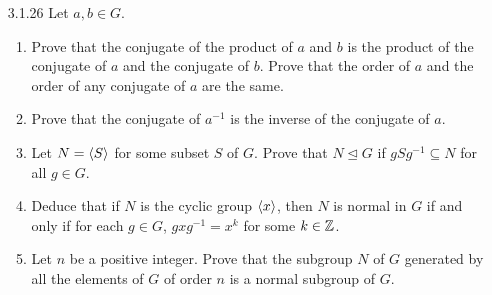 \begin{enumerate}
\begin{enumerate}
               ($\Rightarrow$) Suppose $N \trianglelefteq G$. Let $g \in G$. By
               normality, we have that $gNg^{-1} = N$; particularly, it follows
               that $gNg^{-1} \subseteq N$. Since $g$ was arbitrary, conclude
               that $gNg^{-1} \subseteq N$ for each $g \in G$.
         \item Let $X_j$ be the matrix in $N$ whose entry in the 1st row and
               2nd column is $j \in \Z$. Thus each matrix in $N$ can be written
               as $X_j$ for some unique integer $j$. Observe that $g^{-1}$ is
               the diagonal matrix with entries $1/2, 1$. So for some integer
               $i$, we have that
               $$gX_ig^{-1} = X_{2i} \in N.$$
               That is, $gNg^{-1} \subseteq N$. Thus the (1,2)-entry of
               $gng^{-1}$ is even for each $n \in N$; so $X_1 \neq gng^{-1}$ for
               each $n \in N$, but $X_1 \in N$. Conclude that
               $gNg^{-1} \neq N$, so that $g$ does not normalize $N$.
      \end{enumerate} \qed
   \item[3.1.26]  Let $a, b \in G$.
                  \begin{enumerate}
                     \item Prove that the conjugate of the product of $a$ and
                           $b$ is the product of the conjugate of $a$ and the
                           conjugate of $b$. Prove that the order of $a$ and the
                           order of any conjugate of $a$ are the same.
                     \item Prove that the conjugate of $a^{-1}$ is the inverse
                           of the conjugate of $a$.
                     \item Let $N = \langle S \rangle$ for some subset $S$ of $G$. Prove
                           that $N \trianglelefteq G$ if $gSg^{-1} \subseteq N$
                           for all $g \in G$.
                     \item Deduce that if $N$ is the cyclic group $\langle x \rangle$,
                           then $N$ is normal in $G$ if and only if for each
                           $g \in G$, $gxg^{-1} = x^k$ for some $k \in \mathbb{Z}$.
                     \item Let $n$ be a positive integer. Prove that the
                           subgroup $N$ of $G$ generated by all the elements of
                           $G$ of order $n$ is a normal subgroup of $G$.
                  \end{enumerate}


\end{enumerate}
